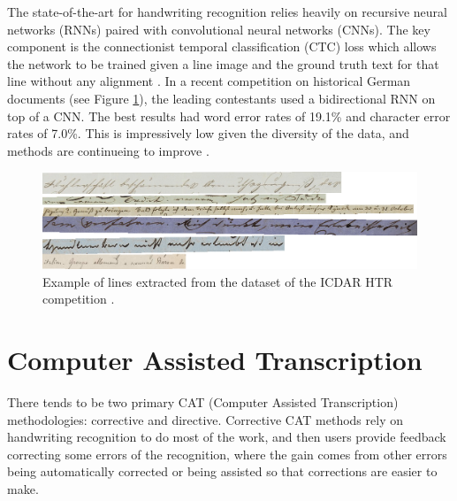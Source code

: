 \documentclass[ms,electronic,twosidetoc,letterpaper,chaptercenter,parttop,lol,lof,lot]{byumsphd}
\begin{document}
The state-of-the-art for handwriting recognition relies heavily on recursive neural networks (RNNs) paired with convolutional neural networks (CNNs). The key component is the connectionist temporal classification (CTC) loss which allows the network to be trained given a line image and the ground truth text for that line without any alignment \cite{CTC}. In a recent competition on historical German documents \cite{icdarComp2017} (see Figure \ref{fig:germanlines}), the leading contestants used a bidirectional RNN on top of a CNN. The best results had word error rates of 19.1\% and character error rates of 7.0\%. This is impressively low given the diversity of the data, and methods are continueing to improve \cite{wigington2017,puigcerver2017}.

\begin{figure}[t]
    \centering
    \includegraphics[width=.98\textwidth]{german_lines}
    \caption{Example of lines extracted from the dataset of the ICDAR HTR competition \cite{icdarComp2017}.}
    \label{fig:germanlines}
\end{figure}


\section{Computer Assisted Transcription} %

There tends to be two primary CAT (Computer Assisted Transcription) methodologies: corrective and directive. Corrective CAT methods rely on handwriting recognition to do most of the work, and then users provide feedback correcting some errors of the recognition, where the gain comes from other errors being automatically corrected or being assisted so that corrections are easier to make.
\end{document}
